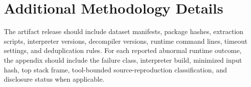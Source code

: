 

\section{Additional Methodology Details}\label{app:method}

The artifact release should include dataset manifests, package hashes, extraction scripts, interpreter versions, decompiler versions, runtime command lines, timeout settings, and deduplication rules.  For each reported abnormal runtime outcome, the appendix should include the failure class, interpreter build, minimized input hash, top stack frame, tool-bounded source-reproduction classification, and disclosure status when applicable.
